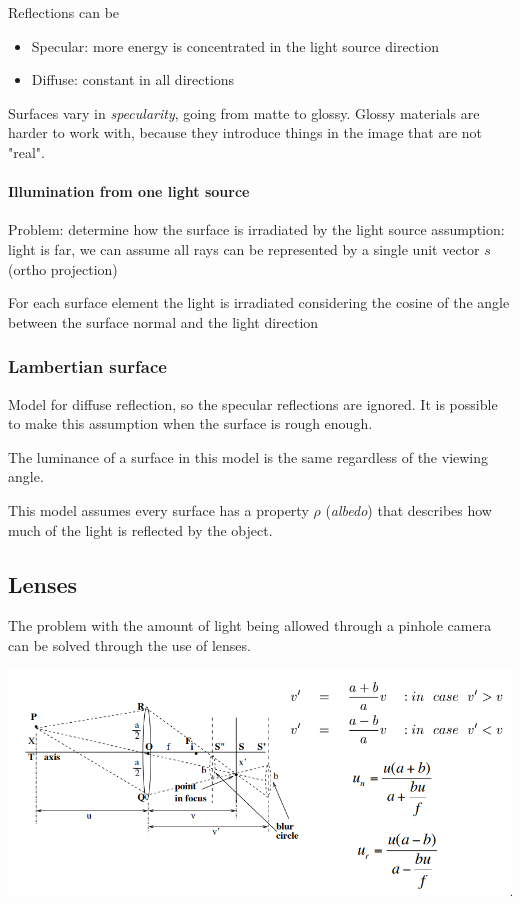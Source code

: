 \documentclass{article}
\begin{document}
Reflections can be
\begin{itemize}
    \item Specular: more energy is concentrated in the light source direction
    \item Diffuse: constant in all directions
\end{itemize}
Surfaces vary in \textit{specularity}, going from matte to glossy. Glossy materials are harder to work with, because they introduce things in the image that are not "real".

\paragraph{Illumination from one light source}
Problem: determine how the surface is irradiated by the light source
assumption: light is far, we can assume all rays can be represented by a single unit vector $s$ (ortho projection)

For each surface element the light is irradiated considering the cosine of the angle between the surface normal and the light direction

\subsubsection{Lambertian surface}
Model for diffuse reflection, so the specular reflections are ignored. It is possible to make this assumption when the surface is rough enough.

The luminance of a surface in this model is the same regardless of the viewing angle.

This model assumes every surface has a property $\rho$ (\textit{albedo}) that describes how much of the light is reflected by the object.

\subsection{Lenses}
The problem with the amount of light being allowed through a pinhole camera can be solved through the use of lenses.
\begin{center}
    \includegraphics[width=1\linewidth]{images/lense.png}
\end{center}
\end{document}
